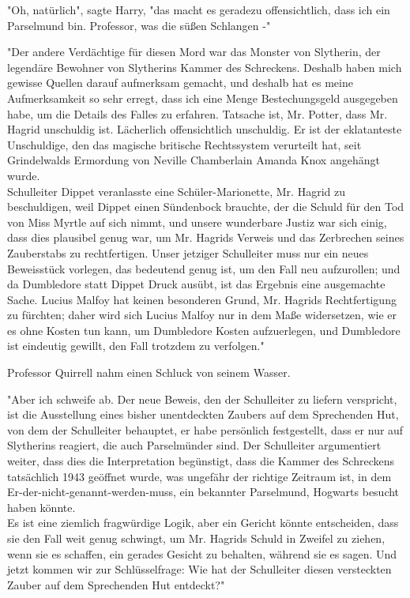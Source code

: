 {"Oh, natürlich", sagte Harry, "das macht es geradezu offensichtlich, dass ich ein Parselmund bin. Professor, was die süßen Schlangen -"

"Der andere Verdächtige für diesen Mord war das Monster von Slytherin, der legendäre Bewohner von Slytherins Kammer des Schreckens. Deshalb haben mich gewisse Quellen darauf aufmerksam gemacht, und deshalb hat es meine Aufmerksamkeit so sehr erregt, dass ich eine Menge Bestechungsgeld ausgegeben habe, um die Details des Falles zu erfahren. Tatsache ist, Mr. Potter, dass Mr. Hagrid unschuldig ist. Lächerlich offensichtlich unschuldig. Er ist der eklatanteste Unschuldige, den das magische britische Rechtssystem verurteilt hat, seit Grindelwalds Ermordung von Neville Chamberlain Amanda Knox angehängt wurde.\\ Schulleiter Dippet veranlasste eine Schüler-Marionette, Mr. Hagrid zu beschuldigen, weil Dippet einen Sündenbock brauchte, der die Schuld für den Tod von Miss Myrtle auf sich nimmt, und unsere wunderbare Justiz war sich einig, dass dies plausibel genug war, um Mr. Hagrids Verweis und das Zerbrechen seines Zauberstabs zu rechtfertigen. Unser jetziger Schulleiter muss nur ein neues Beweisstück vorlegen, das bedeutend genug ist, um den Fall neu aufzurollen; und da Dumbledore statt Dippet Druck ausübt, ist das Ergebnis eine ausgemachte Sache. Lucius Malfoy hat keinen besonderen Grund, Mr. Hagrids Rechtfertigung zu fürchten; daher wird sich Lucius Malfoy nur in dem Maße widersetzen, wie er es ohne Kosten tun kann, um Dumbledore Kosten aufzuerlegen, und Dumbledore ist eindeutig gewillt, den Fall trotzdem zu verfolgen."

Professor Quirrell nahm einen Schluck von seinem Wasser.

"Aber ich schweife ab. Der neue Beweis, den der Schulleiter zu liefern verspricht, ist die Ausstellung eines bisher unentdeckten Zaubers auf dem Sprechenden Hut, von dem der Schulleiter behauptet, er habe persönlich festgestellt, dass er nur auf Slytherins reagiert, die auch Parselmünder sind. Der Schulleiter argumentiert weiter, dass dies die Interpretation begünstigt, dass die Kammer des Schreckens tatsächlich 1943 geöffnet wurde, was ungefähr der richtige Zeitraum ist, in dem Er-der-nicht-genannt-werden-muss, ein bekannter Parselmund, Hogwarts besucht haben könnte.\\ Es ist eine ziemlich fragwürdige Logik, aber ein Gericht könnte entscheiden, dass sie den Fall weit genug schwingt, um Mr. Hagrids Schuld in Zweifel zu ziehen, wenn sie es schaffen, ein gerades Gesicht zu behalten, während sie es sagen. Und jetzt kommen wir zur Schlüsselfrage: Wie hat der Schulleiter diesen versteckten Zauber auf dem Sprechenden Hut entdeckt?"

}
